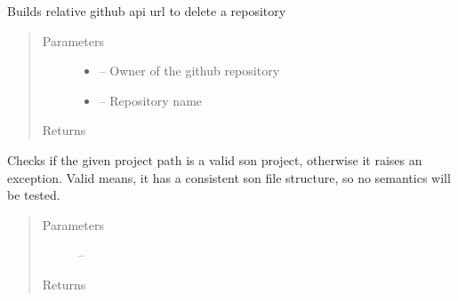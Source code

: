\documentclass[letterpaper,10pt,english]{sphinxmanual}
\begin{document}
\begin{fulllineitems}
\label{_source/son_editor.impl:son_editor.impl.gitimpl.build_github_delete}
Builds relative github api url to delete a repository
\begin{quote}\begin{description}
\item[{Parameters}] \leavevmode\begin{itemize}
\item {} 
 -- Owner of the github repository

\item {} 
 -- Repository name

\end{itemize}

\item[{Returns}] \leavevmode


\end{description}\end{quote}

\end{fulllineitems}


\begin{fulllineitems}
\label{_source/son_editor.impl:son_editor.impl.gitimpl.check_son_validity}
Checks if the given project path is a valid son project, otherwise it raises an exception. Valid means, it has
a consistent son file structure, so no semantics will be tested.
\begin{quote}\begin{description}
\item[{Parameters}] \leavevmode
{} -- 

\item[{Returns}] \leavevmode


\end{description}\end{quote}

\end{fulllineitems}

\end{document}
